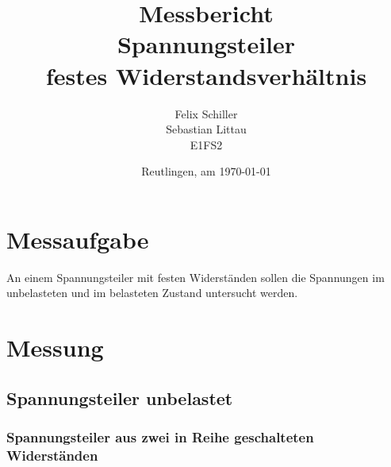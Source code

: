 \documentclass[
a4paper,     %
 headsepline, %
11pt         %
]{scrartcl}  %
\title{Messbericht \\ Spannungsteiler \\ festes Widerstandsverhältnis}
\author{Felix Schiller \\ Sebastian Littau \\ E1FS2}
\date{Reutlingen, am \today{}}
\begin{document}

\maketitle

\newpage
\tableofcontents





\section{Messaufgabe}
An einem Spannungsteiler mit festen Widerständen sollen die Spannungen im unbelasteten und im belasteten Zustand untersucht werden. 

\section{Messung}
\subsection{Spannungsteiler unbelastet}
\subsubsection{Spannungsteiler aus zwei in Reihe geschalteten Widerständen}
\end{document}
